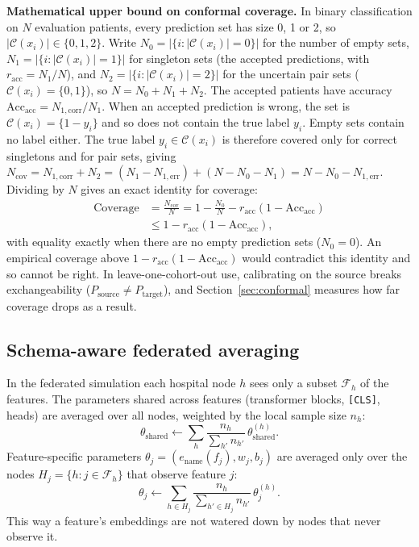 \documentclass[conference]{IEEEtran}
\begin{document}
\textbf{Mathematical upper bound on conformal coverage.} In binary classification on $N$ evaluation patients, every prediction set has size 0, 1 or 2, so $|\mathcal{C}(x_i)|\in\{0,1,2\}$. Write $N_0 = |\{i : |\mathcal{C}(x_i)|=0\}|$ for the number of empty sets, $N_1 = |\{i : |\mathcal{C}(x_i)|=1\}|$ for singleton sets (the accepted predictions, with $r_{\mathrm{acc}}=N_1/N$), and $N_2 = |\{i : |\mathcal{C}(x_i)|=2\}|$ for the uncertain pair sets ($\mathcal{C}(x_i)=\{0,1\}$), so $N=N_0+N_1+N_2$. The accepted patients have accuracy $\mathrm{Acc}_{\mathrm{acc}} = N_{1,\mathrm{corr}}/N_1$. When an accepted prediction is wrong, the set is $\mathcal{C}(x_i)=\{1-y_i\}$ and so does not contain the true label $y_i$. Empty sets contain no label either. The true label $y_i\in\mathcal{C}(x_i)$ is therefore covered only for correct singletons and for pair sets, giving $N_{\mathrm{cov}} = N_{1,\mathrm{corr}} + N_2 = (N_1 - N_{1,\mathrm{err}}) + (N - N_0 - N_1) = N - N_0 - N_{1,\mathrm{err}}$. Dividing by $N$ gives an exact identity for coverage:
\begin{equation}
\begin{split}
\mathrm{Coverage} &= \frac{N_{\mathrm{cov}}}{N} = 1 - \frac{N_0}{N} - r_{\mathrm{acc}}(1 - \mathrm{Acc}_{\mathrm{acc}})\\
&\le 1 - r_{\mathrm{acc}}(1 - \mathrm{Acc}_{\mathrm{acc}}),
\end{split}
\label{eq:conformal_bound}
\end{equation}
with equality exactly when there are no empty prediction sets ($N_0=0$). An empirical coverage above $1 - r_{\mathrm{acc}}(1 - \mathrm{Acc}_{\mathrm{acc}})$ would contradict this identity and so cannot be right. In leave-one-cohort-out use, calibrating on the source breaks exchangeability ($P_{\mathrm{source}}\neq P_{\mathrm{target}}$), and Section~\ref{sec:conformal} measures how far coverage drops as a result.

\subsection{Schema-aware federated averaging}
In the federated simulation each hospital node $h$ sees only a subset $\mathcal{F}_h$ of the features. The parameters shared across features (transformer blocks, \texttt{[CLS]}, heads) are averaged over all nodes, weighted by the local sample size $n_h$:
\begin{equation}
\theta_{\mathrm{shared}}\leftarrow\sum_h \frac{n_h}{\sum_{h'}n_{h'}}\,\theta^{(h)}_{\mathrm{shared}}.
\end{equation}
Feature-specific parameters $\theta_j=(e_{\mathrm{name}}(f_j),w_j,b_j)$ are averaged only over the nodes $H_j=\{h: j\in\mathcal{F}_h\}$ that observe feature $j$:
\begin{equation}
\theta_j\leftarrow\sum_{h\in H_j}\frac{n_h}{\sum_{h'\in H_j}n_{h'}}\,\theta^{(h)}_j.
\end{equation}
This way a feature's embeddings are not watered down by nodes that never observe it.
\end{document}
